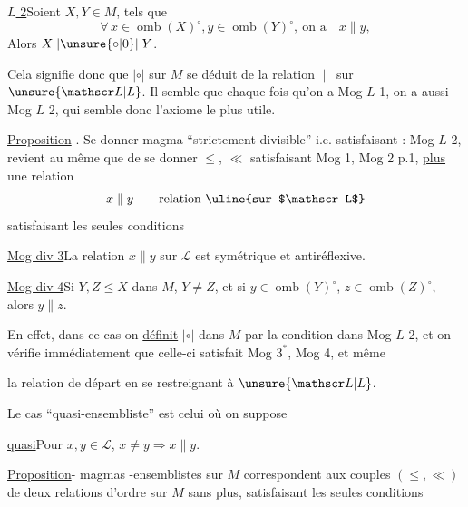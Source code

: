 
\uline{ $L$ 2}\quad\unsure{$\checkmark$}\quad Soient $X,Y\in M$,  tels que
\[
\forall\,x\in\operatorname{omb}(X)^\circ,y\in\operatorname{omb}(Y)^\circ,\ \text{on a}\quad x\parallel y,
\]
Alors $X\mathrel{|\unsure{\circ|0}|}Y$.


Cela signifie donc que $\mathrel{|\circ|}$ sur $M$ se déduit de la  relation $\parallel$ sur $\unsure{\mathscr L|L}$. Il semble que  chaque fois qu'on a Mog $L$ 1, on a aussi Mog $L$ 2, qui semble donc l'axiome le plus utile.

\uline{Proposition}-\uline{}. Se donner    magma ``strictement divisible'' i.e. satisfaisant : Mog $L$ 2, revient au même que de se donner $\leq$, $\ll$ satisfaisant Mog 1, Mog 2 p.1,  \uline{plus} une relation
\[
x\parallel y\qquad\text{relation \uline{sur $\mathscr L$}}
\]
satisfaisant les seules conditions

\uline{Mog div 3}\quad La relation $x\parallel y$ sur $\mathscr L$ est symétrique et antiréflexive.

\uline{Mog div 4}\quad Si $Y,Z\leq X$ dans $M$, $Y\neq Z$, et si $y\in\operatorname{omb}(Y)^\circ$, $z\in\operatorname{omb}(Z)^\circ$, alors $y\parallel z$.

En effet, dans ce cas on \uline{définit} $\mathrel{|\circ|}$ dans $M$ par la condition dans Mog $L$ 2, et on vérifie immédiatement que  celle-ci satisfait Mog $3^*$, Mog 4, et même



la relation de départ en se restreignant à $\unsure{\mathscr L|L}$.

Le cas ``quasi-ensembliste'' est celui où on suppose

\uline{ quasi}\quad Pour $x,y\in\mathscr L$, $x\neq y\Longrightarrow x\parallel y$.

\uline{Proposition}-\uline{}   magmas -ensemblistes sur $M$ correspondent aux couples $(\leq,\ll)$ de deux relations d'ordre sur $M$ sans plus, satisfaisant les seules conditions

